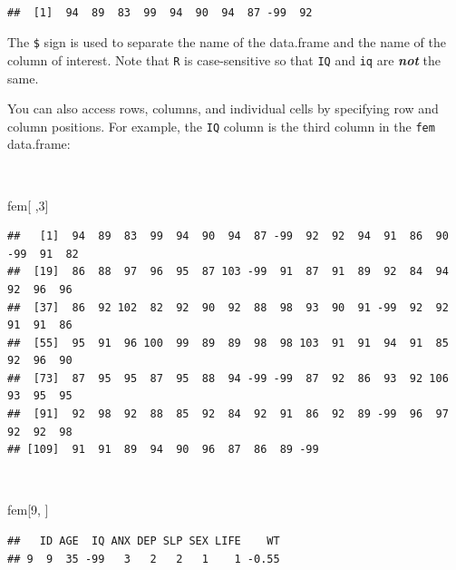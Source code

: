 \documentclass[
  12pt,
]{book}
\newenvironment{Shaded}{\begin{snugshade}}{\end{snugshade}}
\newcommand{\DecValTok}[1]{\textcolor[rgb]{0.00,0.00,0.81}{#1}}
\newcommand{\NormalTok}[1]{#1}
\newcommand{\SpecialCharTok}[1]{\textcolor[rgb]{0.00,0.00,0.00}{#1}}
\begin{document}
~

\begin{Shaded}
\end{Shaded}

\begin{verbatim}
##  [1]  94  89  83  99  94  90  94  87 -99  92
\end{verbatim}

\newpage

The \texttt{\$} sign is used to separate the name of the data.frame and the name of the column of interest. Note that \texttt{R} is case-sensitive so that \texttt{IQ} and \texttt{iq} are \textbf{\emph{not}} the same.

You can also access rows, columns, and individual cells by specifying row and column positions. For example, the \texttt{IQ} column is the third column in the \texttt{fem} data.frame:

~

\begin{Shaded}
\begin{Highlighting}[]
\NormalTok{fem[ ,}\DecValTok{3}\NormalTok{]}
\end{Highlighting}
\end{Shaded}

\begin{verbatim}
##   [1]  94  89  83  99  94  90  94  87 -99  92  92  94  91  86  90 -99  91  82
##  [19]  86  88  97  96  95  87 103 -99  91  87  91  89  92  84  94  92  96  96
##  [37]  86  92 102  82  92  90  92  88  98  93  90  91 -99  92  92  91  91  86
##  [55]  95  91  96 100  99  89  89  98  98 103  91  91  94  91  85  92  96  90
##  [73]  87  95  95  87  95  88  94 -99 -99  87  92  86  93  92 106  93  95  95
##  [91]  92  98  92  88  85  92  84  92  91  86  92  89 -99  96  97  92  92  98
## [109]  91  91  89  94  90  96  87  86  89 -99
\end{verbatim}

~

\begin{Shaded}
\begin{Highlighting}[]
\NormalTok{fem[}\DecValTok{9}\NormalTok{, ]}
\end{Highlighting}
\end{Shaded}

\begin{verbatim}
##   ID AGE  IQ ANX DEP SLP SEX LIFE    WT
## 9  9  35 -99   3   2   2   1    1 -0.55
\end{verbatim}
\end{document}
